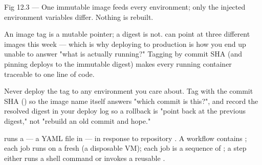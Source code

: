 \begin{wbfigure}{Fig 12.3 --- One immutable image feeds every environment; only the injected environment variables differ. Nothing is rebuilt.}
\end{wbfigure}

\begin{behind}
An image tag is a mutable pointer; a digest is not.  can point at three different images this week --- which is why deploying  to production is how you end up unable to answer "what is actually running?" Tagging by commit SHA (and pinning deploys to the immutable  digest) makes every running container traceable to one line of code.
\end{behind}

\begin{prodtip}
Never deploy the  tag to any environment you care about. Tag with the commit SHA () so the image name itself answers "which commit is this?", and record the resolved  digest in your deploy log so a rollback is "point back at the previous digest," not "rebuild an old commit and hope."
\end{prodtip}


  runs a  --- a YAML file in  --- in response to repository . A workflow contains ; each job runs on a fresh  (a disposable VM); each job is a sequence of ; a step either runs a shell command or invokes a reusable .

